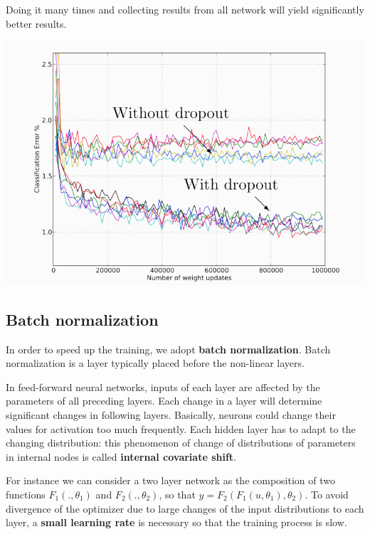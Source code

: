 \documentclass[10pt]{report}
\begin{document}
Doing it many times and collecting results from all network will yield
significantly better results. \begin{center}
\includegraphics[width=.9\linewidth]{./pics/cnn/dropout4.jpg}
\end{center}

\subsection{Batch normalization}
\label{batch-normalization}
In order to speed up the training, we adopt \textbf{batch normalization}. Batch
normalization is a layer typically placed before the non-linear layers.

In feed-forward neural networks, inputs of each layer are affected by
the parameters of all preceding layers. Each change in a layer will
determine significant changes in following layers. Basically, neurons
could change their values for activation too much frequently. Each
hidden layer has to adapt to the changing distribution: this phenomenon
of change of distributions of parameters in internal nodes is called
\textbf{internal covariate shift}.

For instance we can consider a two layer network as the composition of
two functions \(F_1(., \theta_1)\) and \(F_2(., \theta_2)\), so that
\(y = F_2(F_1(u,\theta_1), \theta_2)\). To avoid divergence of the
optimizer due to large changes of the input distributions to each
layer, a \textbf{small learning rate} is necessary so that the training
process is slow.
\end{document}
